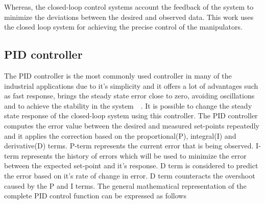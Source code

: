 \begin{center}
\vspace{0.5cm}
\vspace{0.5cm}
\end{center}

Whereas, the closed-loop control systems account the feedback of the system to minimize the deviations between the desired and observed data. This work uses the closed loop system for achieving the precise control of the manipulators.

\subsection*{PID controller}
The PID controller is the most commonly used controller in many of the industrial applications due to it's simplicity and it offers a lot of advantages such as fast response, brings the steady state error close to zero, avoiding oscillations and to achieve the stability in the system~\cite{temelp}~\cite{Chung2016}. It is possible to change the steady state response of the closed-loop system using this controller. The PID controller computes the error value between the desired and measured set-points repeatedly and it applies the correction based on the proportional(P), integral(I) and derivative(D) terms. P-term represents the current error that is being observed. I-term represents the history of errors which will be used to minimize the error between the expected set-point and it's response. D term is considered to predict the error based on it's rate of change in error. D term counteracts the overshoot caused by the P and I terms. The general mathematical representation of the complete PID control function can be expressed as follows

